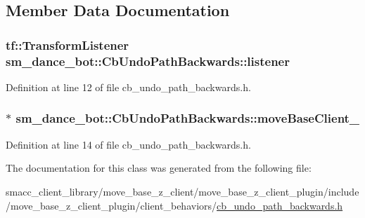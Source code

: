 \subsection{Member Data Documentation}
\subsubsection[{\texorpdfstring{listener}{listener}}]{\setlength{\rightskip}{0pt plus 5cm}tf\+::\+Transform\+Listener sm\+\_\+dance\+\_\+bot\+::\+Cb\+Undo\+Path\+Backwards\+::listener\hspace{0.3cm}{\ttfamily [private]}}\hypertarget{classsm__dance__bot_1_1CbUndoPathBackwards_a35aa53997f49c33d11a43cca81a72dfd}{}\label{classsm__dance__bot_1_1CbUndoPathBackwards_a35aa53997f49c33d11a43cca81a72dfd}


Definition at line 12 of file cb\+\_\+undo\+\_\+path\+\_\+backwards.\+h.

\subsubsection[{\texorpdfstring{move\+Base\+Client\+\_\+}{moveBaseClient_}}]{ $\ast$ sm\+\_\+dance\+\_\+bot\+::\+Cb\+Undo\+Path\+Backwards\+::move\+Base\+Client\+\_\+\hspace{0.3cm}{\ttfamily [private]}}\hypertarget{classsm__dance__bot_1_1CbUndoPathBackwards_a2e134a879373ea9d29d04f72f707cbc8}{}\label{classsm__dance__bot_1_1CbUndoPathBackwards_a2e134a879373ea9d29d04f72f707cbc8}


Definition at line 14 of file cb\+\_\+undo\+\_\+path\+\_\+backwards.\+h.



The documentation for this class was generated from the following file\+:\begin{DoxyCompactItemize}
\item 
smacc\+\_\+client\+\_\+library/move\+\_\+base\+\_\+z\+\_\+client/move\+\_\+base\+\_\+z\+\_\+client\+\_\+plugin/include/move\+\_\+base\+\_\+z\+\_\+client\+\_\+plugin/client\+\_\+behaviors/\hyperlink{smacc__client__library_2move__base__z__client_2move__base__z__client__plugin_2include_2move__bascbc9ae7d3990516ddb2c98e15a09bcd2}{cb\+\_\+undo\+\_\+path\+\_\+backwards.\+h}\end{DoxyCompactItemize}
